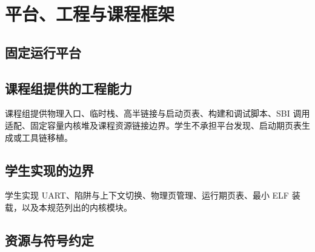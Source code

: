 \chapter{平台、工程与课程框架}

\section{固定运行平台}

\section{课程组提供的工程能力}
课程组提供物理入口、临时栈、高半链接与启动页表、构建和调试脚本、SBI 调用适配、固定容量内核堆及课程资源链接边界。学生不承担平台发现、启动期页表生成或工具链移植。

\section{学生实现的边界}
学生实现 UART、陷阱与上下文切换、物理页管理、运行期页表、最小 ELF 装载，以及本规范列出的内核模块。

\section{资源与符号约定}

